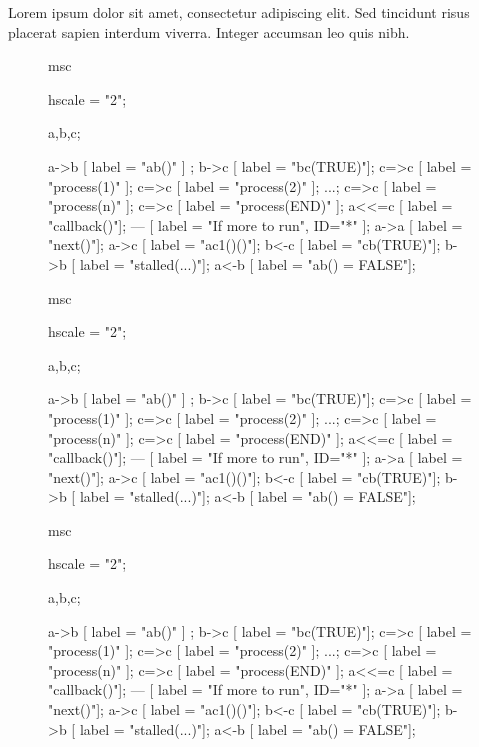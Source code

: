\documentclass[11pt]{article}
\begin{document}
Lorem ipsum dolor sit amet, consectetur adipiscing elit. Sed tincidunt risus placerat sapien interdum viverra. Integer accumsan leo quis nibh.

\begin{figure}[htb]
\begin{center}
\begin{msc}
msc {
  hscale = "2";

  a,b,c;

  a->b [ label = "ab()" ] ;
  b->c [ label = "bc(TRUE)"];
  c=>c [ label = "process(1)" ];
  c=>c [ label = "process(2)" ];
  ...;
  c=>c [ label = "process(n)" ];
  c=>c [ label = "process(END)" ];
  a<<=c [ label = "callback()"];
  ---  [ label = "If more to run", ID="*" ];
  a->a [ label = "next()"];
  a->c [ label = "ac1()()"];
  b<-c [ label = "cb(TRUE)"];
  b->b [ label = "stalled(...)"];
  a<-b [ label = "ab() = FALSE"];
}
\end{msc}
\end{center}
\end{figure}

\begin{figure}[htb]
\begin{center}
\begin{msc}[width=5cm]
msc {
  hscale = "2";

  a,b,c;

  a->b [ label = "ab()" ] ;
  b->c [ label = "bc(TRUE)"];
  c=>c [ label = "process(1)" ];
  c=>c [ label = "process(2)" ];
  ...;
  c=>c [ label = "process(n)" ];
  c=>c [ label = "process(END)" ];
  a<<=c [ label = "callback()"];
  ---  [ label = "If more to run", ID="*" ];
  a->a [ label = "next()"];
  a->c [ label = "ac1()()"];
  b<-c [ label = "cb(TRUE)"];
  b->b [ label = "stalled(...)"];
  a<-b [ label = "ab() = FALSE"];
}
\end{msc}
\end{center}
\end{figure}

\begin{figure}[htb]
\begin{center}
\begin{msc}[format=png]
msc {
  hscale = "2";

  a,b,c;

  a->b [ label = "ab()" ] ;
  b->c [ label = "bc(TRUE)"];
  c=>c [ label = "process(1)" ];
  c=>c [ label = "process(2)" ];
  ...;
  c=>c [ label = "process(n)" ];
  c=>c [ label = "process(END)" ];
  a<<=c [ label = "callback()"];
  ---  [ label = "If more to run", ID="*" ];
  a->a [ label = "next()"];
  a->c [ label = "ac1()()"];
  b<-c [ label = "cb(TRUE)"];
  b->b [ label = "stalled(...)"];
  a<-b [ label = "ab() = FALSE"];
}
\end{msc}
\end{center}
\end{figure}
\end{document}
